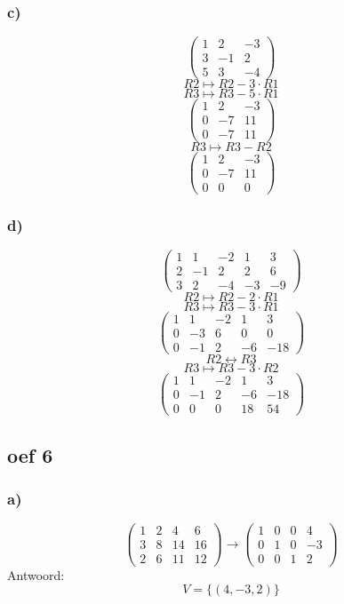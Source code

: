\documentclass[lineaire_algebra_oplossingen.tex]{subfiles}
\begin{document}
\subsubsection*{c)}
\[
\begin{pmatrix}
1 &  2 &  -3\\
3 &  -1 &  2\\
5 &  3 &  -4
\end{pmatrix}
\]
\[ R2 \longmapsto R2 -3\cdot R1\]
\[ R3 \longmapsto R3 -5\cdot R1\]
\[
\begin{pmatrix}
1 &  2 &  -3\\
0 &  -7 &  11\\
0 &  -7 &  11
\end{pmatrix}
\]
\[ R3 \longmapsto R3 - R2\]
\[
\begin{pmatrix}
1 &  2 &  -3\\
0 &  -7 &  11\\
0 &  0 &  0
\end{pmatrix}
\]

\subsubsection*{d)}
\[
\begin{pmatrix}
1 &  1 &  -2 & 1 & 3\\
2 &  -1 &  2 & 2 & 6\\
3 &  2 &  -4 & -3 & -9
\end{pmatrix}
\]
\[ R2 \longmapsto R2 -2\cdot R1\]
\[ R3 \longmapsto R3 -3\cdot R1\]
\[
\begin{pmatrix}
1 &  1 &  -2 & 1 & 3\\
0 &  -3 &  6 & 0 & 0\\
0 &  -1 &  2 & -6 & -18
\end{pmatrix}
\]
\[ R2 \leftrightarrow R3\]
\[ R3 \longmapsto R3 -3\cdot R2\]
\[
\begin{pmatrix}
1 &  1 &  -2 & 1 & 3\\
0 &  -1 &  2 & -6 & -18\\
0 &  0 &  0 & 18 & 54
\end{pmatrix}
\]

\subsection{oef 6}
\subsubsection*{a)}
\[
\begin{pmatrix}
1 &  2 &  4 &  6\\
3 &  8 & 14 & 16\\
2 &  6 & 11 & 12
\end{pmatrix}
\longrightarrow
\begin{pmatrix}
1 &  0 &  0 &  4\\
0 &  1 &  0 & -3\\
0 &  0 &  1 &  2
\end{pmatrix}
\]
Antwoord:
\[
V=\{(4,-3,2)\}
\]
\end{document}
